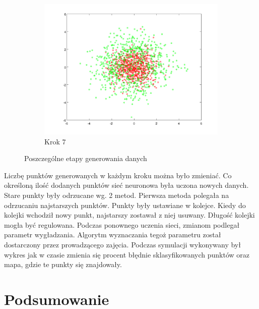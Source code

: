 \documentclass[10pt,a4paper]{article}
\begin{document}
\begin{figure}[h]
  \begin{center}
  \begin{subfigure}[b]{0.4\textwidth}
    \includegraphics[width=\textwidth]{dataGen_step6.png}
    \caption{Krok 7}
  \end{subfigure}
  \end{center}
  
  \caption{Poszczególne etapy generowania danych}
  \label{dataGen}
  
\end{figure}
Liczbę punktów generowanych w każdym kroku można było zmieniać. Co określoną ilość dodanych punktów sieć neuronowa była uczona nowych danych. Stare punkty były odrzucane wg. 2 metod. Pierwsza metoda polegała na odrzucaniu najstarszych punktów. Punkty były ustawiane w kolejce. Kiedy do kolejki wchodził nowy punkt, najstarszy zostawał z niej usuwany. Długość kolejki mogła być regulowana. Podczas ponownego uczenia sieci, zmianom podlegał parametr wygładzania. Algorytm wyznaczania tegoż parametru został dostarczony przez prowadzącego zajęcia. Podczas symulacji wykonywany był wykres jak w czasie zmienia się procent błędnie sklasyfikowanych punktów oraz mapa, gdzie te punkty się znajdowały. 


\section{Podsumowanie}
\end{document}
